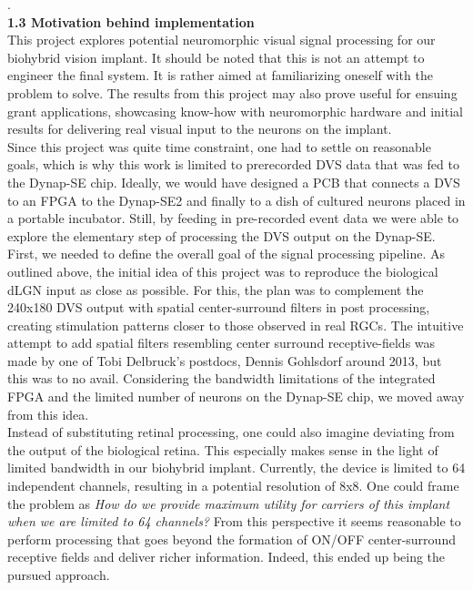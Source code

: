 \documentclass[8pt]{beamer}
\begin{document}
\begin{small}
	\tiny .\\
	\selectfont
	\small
	\textbf{ 1.3 Motivation behind implementation} \\ 
	This project explores potential neuromorphic visual signal processing for
	our biohybrid vision implant. It should be noted that this is not an attempt
	to engineer the final system. It is rather aimed at familiarizing oneself
	with the problem to solve. The results from this project may also prove
	useful for ensuing grant applications, showcasing know-how with neuromorphic
	hardware and initial results for delivering real visual input to the neurons
	on the implant. \\ \vspace{.1cm}
	Since this project was quite time constraint, one had to settle on
	reasonable goals, which is why this work is limited to prerecorded DVS data
	that was fed to the Dynap-SE chip. Ideally, we would have designed a PCB
	that connects a DVS to an FPGA to the Dynap-SE2 and finally to a dish of
	cultured neurons placed in a portable incubator. Still, by feeding in
	pre-recorded event data we were able to explore the elementary step of
	processing the DVS output on the Dynap-SE. \\ \vspace{.1cm}
	First, we needed to define the overall goal of the signal processing
	pipeline. As outlined above, the initial idea of this project was to
	reproduce the biological dLGN input as close as possible. For this, the plan
	was to complement the 240x180 DVS output with spatial center-surround
	filters in post processing, creating stimulation patterns closer to those
	observed in real RGCs. The intuitive attempt to add spatial filters
	resembling center surround receptive-fields was made by one of Tobi
	Delbruck's postdocs, Dennis Gohlsdorf around 2013, but this was to no avail.
	Considering the bandwidth limitations of the integrated FPGA and the limited
	number of neurons on the Dynap-SE chip, we moved away from this idea. \\ \vspace{.1cm}
	Instead of substituting retinal processing, one could also imagine deviating
	from the output of the biological retina. This especially makes sense in the
	light of limited bandwidth in our biohybrid implant. Currently, the device
	is limited to 64 independent channels, resulting in a potential resolution
	of 8x8. One could frame the problem as \textit{How do we provide maximum
	utility for carriers of this implant when we are limited to 64 channels?}
	From this perspective it seems reasonable to perform processing that goes
	beyond the formation of ON/OFF center-surround receptive fields and deliver
	richer information. Indeed, this ended up being the pursued approach. 
	\pagebreak
	

\end{small}
\end{document}
